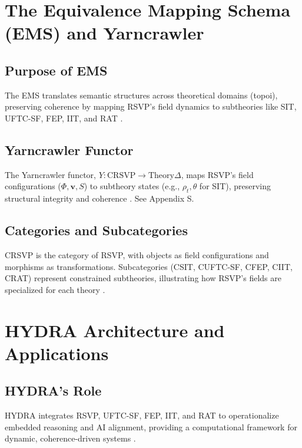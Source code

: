 \documentclass[12pt]{report}
\newcommand{\PhiRSVP}{\Phi}
\newcommand{\vRSVP}{\mathbf{v}}
\newcommand{\SRSVP}{S}
\begin{document}
{{\chapter{The Equivalence Mapping Schema (EMS) and Yarncrawler}
\section{Purpose of EMS}
The EMS translates semantic structures across theoretical domains (topoi), preserving coherence by mapping RSVP’s field dynamics to subtheories like SIT, UFTC-SF, FEP, IIT, and RAT \citep{RSVPMeta2025}.

\section{Yarncrawler Functor}
The Yarncrawler functor, \(Y: \text{CRSVP} \to \text{Theory}\Delta\), maps RSVP’s field configurations (\(\PhiRSVP, \vRSVP, \SRSVP\)) to subtheory states (e.g., \(\rho_t, \theta\) for SIT), preserving structural integrity and coherence \citep{SocioeconomicFunctors2025}. See Appendix S.

\section{Categories and Subcategories}
CRSVP is the category of RSVP, with objects as field configurations and morphisms as transformations. Subcategories (CSIT, CUFTC-SF, CFEP, CIIT, CRAT) represent constrained subtheories, illustrating how RSVP’s fields are specialized for each theory \citep{RSVPMeta2025}.

\chapter{HYDRA Architecture and Applications}
\section{HYDRA’s Role}
HYDRA integrates RSVP, UFTC-SF, FEP, IIT, and RAT to operationalize embedded reasoning and AI alignment, providing a computational framework for dynamic, coherence-driven systems \citep{HYDRA2025}.

}}
\end{document}
